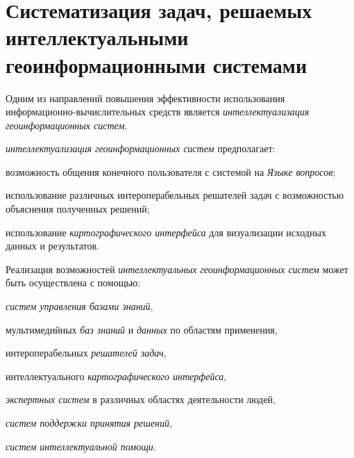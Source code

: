 
\section{Систематизация задач, решаемых интеллектуальными геоинформационными системами}
\label{chapter_gis_sec_tasks}

Одним из направлений повышения эффективности использования информационно-вычислительных средств является \textit{интеллектуализация геоинформационных систем}.

\textit{интеллектуализация геоинформационных систем} предполагает:
\begin{textitemize}
	\item возможность общения конечного пользователя с системой на \textit{Языке вопросов};
	\item использование различных интероперабельных решателей задач с возможностью объяснения полученных решений;
	\item использование \textit{картографического интерфейса} для визуализации исходных данных и результатов.
\end{textitemize}
	
Реализация возможностей \textit{интеллектуальных геоинформационных систем} может быть осуществлена с помощью:
\begin{textitemize}
	\item \textit{систем управления базами знаний},
	\item мультимедийных \textit{баз знаний} и \textit{данных} по областям применения,
	\item интероперабельных \textit{решателей задач},
	\item интеллектуального \textit{картографического интерфейса},
	\item \textit{экспертных систем} в различных областях деятельности людей,
	\item \textit{систем поддержки принятия решений},
	\item \textit{систем интеллектуальной помощи}.
\end{textitemize}


